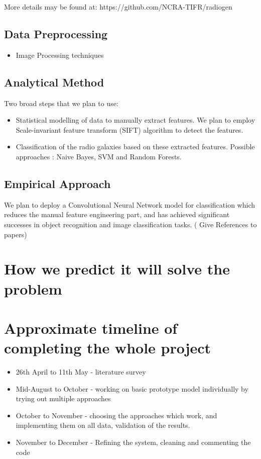 \documentclass{article}
\begin{document}
\begin{multicols*}{2}
More details may be found at: https://github.com/NCRA-TIFR/radiogen

\subsection{Data Preprocessing}

\begin{itemize}
\item Image Processing techniques
\end{itemize}

\subsection{Analytical Method}

Two broad steps that we plan to use: 
\begin{itemize}
	\item Statistical modelling of data to manually extract features. We plan to employ Scale-invariant feature transform (SIFT) algorithm to detect the features.  
	\item Classification of the radio galaxies based on these extracted features. Possible approaches : Naive Bayes, SVM and Random Forests.
\end{itemize}


\subsection{Empirical Approach}

We plan to deploy a Convolutional Neural Network model for classification which reduces the manual feature engineering part, and has achieved significant successes in object recognition and image classification tasks. ( Give References to papers) 
    


\section{How we predict it will solve the problem}

\section{Approximate timeline of completing the whole project}
\begin{itemize}
	\item 26th April to 11th May - literature survey
	\item Mid-August to October - working on basic prototype model individually by trying out multiple approaches
	\item October to November - choosing the approaches which work, and implementing them on all data, validation of the results.
	\item November to December - Refining the system, cleaning and commenting the code
\end{itemize} 






\end{multicols*}
\end{document}
